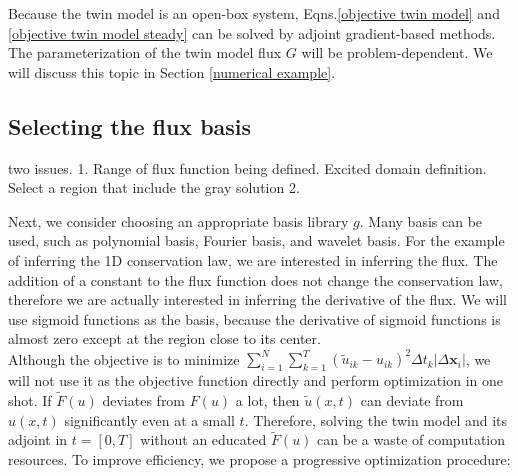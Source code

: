 \documentclass[a4paper,onecolumn]{article}
\theoremstyle{remark}
\begin{document}
\indent Because the twin model is an open-box system, Eqns.\eqref{objective twin model} 
and \eqref{objective twin model steady} can be solved by adjoint gradient-based methods.
The parameterization of the twin model flux $G$ will be problem-dependent. We will discuss
this topic in Section \ref{numerical example}.

\subsection{Selecting the flux basis}
two issues.
1. Range of flux function being defined.
Excited domain definition.
Select a region that include the gray solution
2.

\indent Next, we consider choosing an appropriate basis library $g$.
Many basis can be used, such as polynomial basis, Fourier basis, and wavelet basis.
For the example of inferring the 1D conservation law, we are interested in inferring the flux.
The addition of a constant to the flux function does not change the conservation law,
therefore we are actually interested in inferring the derivative of the flux.
We will use sigmoid functions as the basis, because the derivative of sigmoid functions
is almost zero except at the region close to its center.\\

\noindent Although the objective is to minimize 
$
\sum_{i=1}^{N}\sum_{k=1}^{T} \left(\tilde{u}_{ik} - u_{ik}\right)^2 \Delta t_k
\left| \Delta \mathbf{x}_i \right|
$, we will not use it as the objective function directly and perform optimization
in one shot. If $\tilde{F}(u)$ deviates from $F(u)$ a lot, then $\tilde{u}(x,t)$
can deviate from ${u}(x,t)$ significantly even at a small $t$. 
Therefore, solving the twin model and its adjoint in $t=[0,T]$ without
an educated $\tilde{F}(u)$ can be a waste of computation 
resources. To improve efficiency, we propose a progressive optimization
procedure:\\
\\
\end{document}
